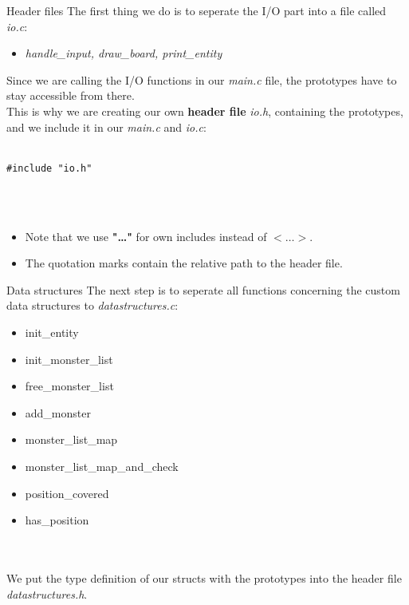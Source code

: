 \begin{frame}[fragile]{Header files}
	The first thing we do is to seperate the I/O part into a file called \textit{io.c}:\\
	\begin{itemize}
		\item \textit{handle\_input, draw\_board, print\_entity}
	\end{itemize}
	Since we are calling the I/O functions in our \textit{main.c} file, the prototypes have to stay accessible from there.\\
	This is why we are creating our own \textbf{header file} \textit{io.h}, containing the prototypes, and we include it in our \textit{main.c} and \textit{io.c}:\\\ \\
	\begin{lstlisting}
#include "io.h"
\end{lstlisting}\ \\\ \\
	\begin{itemize}
		\item Note that we use \textbf{"\ldots"} for own includes instead of $\boldsymbol{<\ldots>}$.
		\item The quotation marks contain the relative path to the header file.
	\end{itemize}
\end{frame}

\begin{frame}{Data structures}
	The next step is to seperate all functions concerning the custom data structures to \textit{datastructures.c}:
	\begin{itemize}
		\item init\_entity
		\item init\_monster\_list
		\item free\_monster\_list
		\item add\_monster
		\item monster\_list\_map
		\item monster\_list\_map\_and\_check
		\item position\_covered
		\item has\_position
	\end{itemize}\ \\\ \\
	We put the type definition of our structs with the prototypes into the header file \textit{datastructures.h}.

\end{frame}

